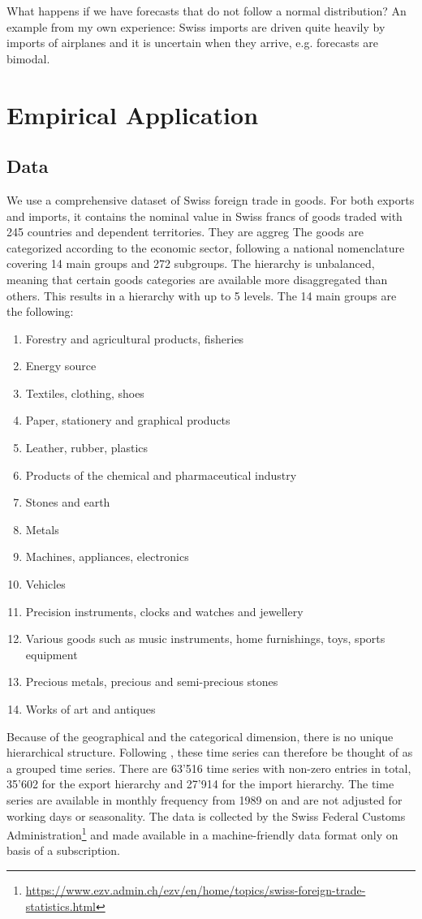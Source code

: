 \documentclass[a4paper,fleqn,11pt]{article}
\begin{document}
What happens if we have forecasts that do not follow a normal distribution? An example from my own experience: Swiss imports are driven quite heavily by imports of airplanes and it is uncertain when they arrive, e.g. forecasts are bimodal.

\clearpage

\section{Empirical Application}
\subsection{Data}
We use a comprehensive dataset of Swiss foreign trade in goods. For both exports and imports, it contains the nominal value in Swiss francs of goods traded with 245 countries and dependent territories. They are aggreg The goods are categorized according to the economic sector, following a national nomenclature covering 14 main groups and 272 subgroups. The hierarchy is unbalanced, meaning that certain goods categories are available more disaggregated than others. This results in a hierarchy with up to 5 levels. The 14 main groups are the following:
\begin{enumerate}[itemsep=-1ex,partopsep=1ex,parsep=1ex]
    \item Forestry and agricultural products, fisheries
    \item Energy source
    \item Textiles, clothing, shoes
    \item Paper, stationery and graphical products
    \item Leather, rubber, plastics 
    \item Products of the chemical and pharmaceutical industry
    \item Stones and earth
    \item Metals
    \item Machines, appliances, electronics
    \item Vehicles
    \item Precision instruments, clocks and watches and jewellery  
    \item Various goods such as music instruments, home furnishings, toys, sports equipment
    \item Precious metals, precious and semi-precious stones
    \item Works of art and antiques
\end{enumerate}
Because of the geographical and the categorical dimension, there is no unique hierarchical structure. Following \cite{Hyndman2016}, these time series can therefore be thought of as a grouped time series. There are 63'516 time series with non-zero entries in total, 35'602 for the export hierarchy and 27'914 for the import hierarchy. The time series are available in monthly frequency from 1989 on and are not adjusted for working days or seasonality. The data is collected by the Swiss Federal Customs Administration\footnote{\url{https://www.ezv.admin.ch/ezv/en/home/topics/swiss-foreign-trade-statistics.html}} and made available in a machine-friendly data format only on basis of a subscription.\\
\end{document}
